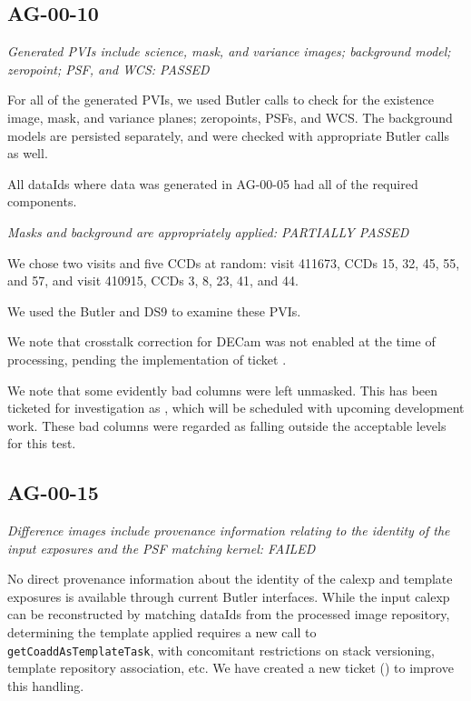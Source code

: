 \documentclass[DM,lsstdraft,STR,toc]{lsstdoc}
\begin{document}
\subsection{AG-00-10}
\label{sect:ag-00-10}

\textit{Generated PVIs include science, mask, and variance images; background model; zeropoint; PSF, and WCS: PASSED}

For all of the generated PVIs, we used Butler calls to check for the existence
image, mask, and variance planes; zeropoints, PSFs, and WCS. The background models are persisted separately, and were checked with appropriate Butler calls as well.

All dataIds where data was generated in AG-00-05 had all of the required components.

\textit{Masks and background are appropriately applied: PARTIALLY PASSED}

We chose two visits and five CCDs at random:
visit 411673, CCDs 15, 32, 45, 55, and 57, and
visit 410915, CCDs 3,  8, 23, 41, and 44.

We used the Butler and DS9 to examine these PVIs.

We note that crosstalk correction for DECam was not enabled at the time of
processing, pending the implementation of ticket .

We note that some evidently bad columns were left unmasked. This has been
ticketed for investigation as , which will be scheduled with
upcoming development work. These bad columns were regarded as falling outside
the acceptable levels for this test.

\subsection{AG-00-15}
\label{sect:ag-00-15}

\textit{Difference images include provenance information relating to the
identity of the input exposures and the PSF matching kernel:  FAILED}

No direct provenance information about the identity of the calexp and template
exposures is available through current Butler interfaces.  While the input
calexp can be reconstructed by matching dataIds from the processed image
repository, determining the template applied requires a new call to
\texttt{getCoaddAsTemplateTask}, with concomitant restrictions on
stack versioning, template repository association, etc.
We have created a new ticket () to improve this handling.
\end{document}
